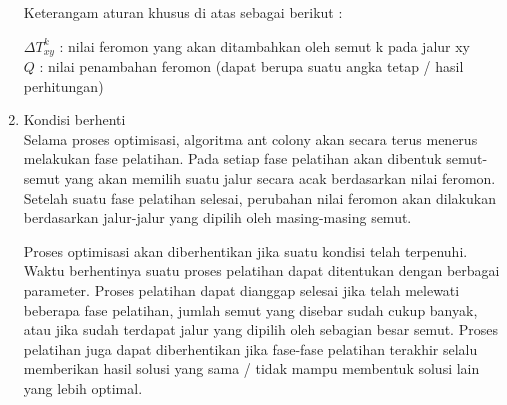 \begin{enumerate}
	
	Keterangam aturan khusus di atas sebagai berikut :
	
	$\Delta T_{xy}^k$ : nilai feromon yang akan ditambahkan oleh semut k pada jalur xy\\
	$Q$ 				: nilai penambahan feromon (dapat berupa suatu angka tetap / hasil perhitungan)\\
	
	\item Kondisi berhenti\\
	Selama proses optimisasi, algoritma ant colony akan secara terus menerus melakukan fase pelatihan.
	Pada setiap fase pelatihan akan dibentuk semut-semut yang akan memilih suatu jalur secara acak
	berdasarkan nilai feromon. Setelah suatu fase pelatihan selesai, perubahan nilai feromon akan
	dilakukan berdasarkan jalur-jalur yang dipilih oleh masing-masing semut.
	
	Proses optimisasi akan diberhentikan jika suatu kondisi telah terpenuhi. Waktu berhentinya
	suatu proses pelatihan dapat ditentukan dengan berbagai parameter. Proses pelatihan dapat dianggap
	selesai jika telah melewati beberapa fase pelatihan, jumlah semut yang disebar sudah cukup
	banyak, atau jika sudah terdapat jalur yang dipilih oleh sebagian besar semut. Proses pelatihan
	juga dapat diberhentikan jika fase-fase pelatihan terakhir selalu memberikan hasil solusi yang sama
	/ tidak mampu membentuk solusi lain yang lebih optimal.
\end{enumerate}
